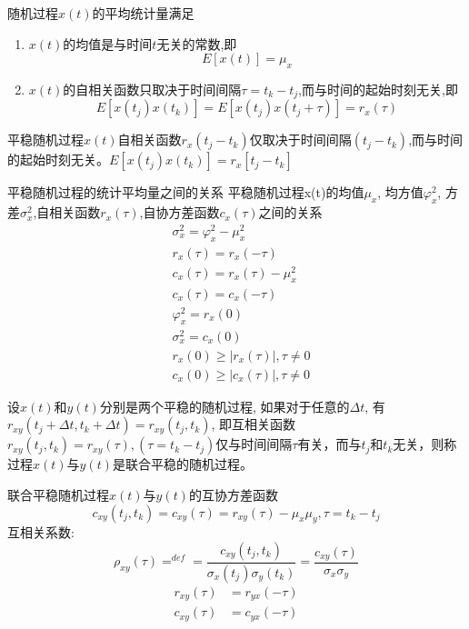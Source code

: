 \begin{frame}
\begin{definition}
	随机过程$x(t)$的平均统计量满足
	\begin{enumerate}
		\item $x(t)$的均值是与时间$t$无关的常数,即
		\[E[x(t)]=\mu_x\]
		\item $x(t)$的自相关函数只取决于时间间隔$\tau=t_k-t_j$,而与时间的起始时刻无关,即
		\[E[x(t_j)x(t_k)]=E[x(t_j)x(t_j+\tau)]=r_x(\tau) \]
	\end{enumerate}
\end{definition}
平稳随机过程$x(t)$自相关函数$r_x(t_j-t_k)$仅取决于时间间隔$(t_j-t_k)$,而与时间的起始时刻无关。$E[x(t_j)x(t_k)]=r_x[t_j-t_k]$
\end{frame}

\begin{frame}{平稳随机过程的统计平均量之间的关系}
平稳随机过程x(t)的均值$\mu_x$, 均方值$\varphi_x^2$, 方差$\sigma_x^2$,自相关函数$r_x(\tau)$,自协方差函数$c_x(\tau)$之间的关系
\begin{align*}
&\sigma_x^2=\varphi_x^2-\mu_x^2\\
&r_x(\tau)=r_x(-\tau)\\
&c_x(\tau)=r_x(\tau)-\mu_x^2\\
&c_x(\tau)=c_x(-\tau)\\
&\varphi_x^2=r_x(0)\\
&\sigma_x^2=c_x(0)\\
&r_x(0)\ge|r_x(\tau)|, \tau\ne 0\\
&c_x(0)\ge|c_x(\tau)|, \tau\ne 0
\end{align*}
\end{frame}

\begin{frame}
\begin{definition}[联合平稳随机过程]
	设$x(t)$和$y(t)$分别是两个平稳的随机过程, 如果对于任意的$\Delta t$, 有$r_{xy}(t_j+\Delta t,t_k+\Delta t)=r_{xy}(t_j,t_k)$, 即互相关函数$r_{xy}(t_j,t_k)=r_{xy}(\tau),(\tau=t_k-t_j)$仅与时间间隔$\tau$有关，而与$t_j$和$t_k$无关，则称过程$x(t)$与$y(t)$是联合平稳的随机过程。
\end{definition}
\begin{block}{联合平稳随机过程$x(t)$与$y(t)$的互协方差函数}
	\[c_{xy}(t_j,t_k)=c_{xy}(\tau)=r_{xy}(\tau)-\mu_x\mu_y, \tau=t_k-t_j\]
	互相关系数:
	\[\rho_{xy}(\tau)\mathop{=}^{def}=\frac{c_{xy}(t_j,t_k)}{\sigma_x(t_j)\sigma_y(t_k)}=\frac{c_{xy}(\tau)}{\sigma_x\sigma_y}\]
	\begin{align*}
	r_{xy}(\tau)&=r_{yx}(-\tau)\\
	c_{xy}(\tau)&=c_{yx}(-\tau)
	\end{align*}
\end{block}
\end{frame}

